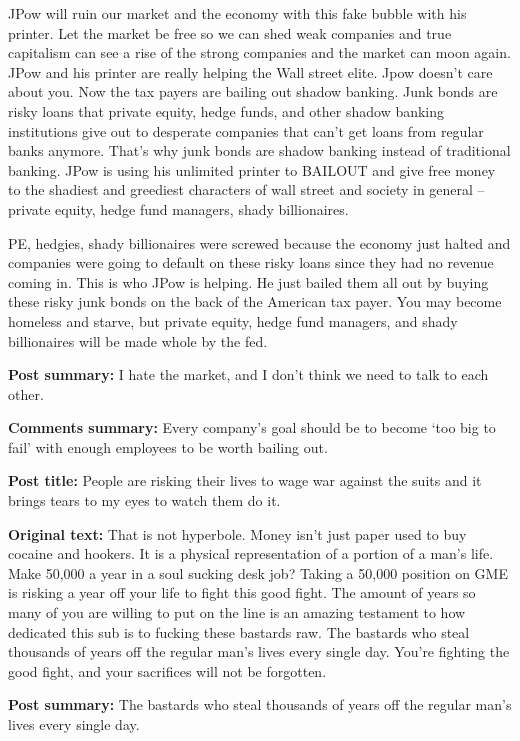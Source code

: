 JPow will ruin our market and the economy with this fake bubble with his printer. Let the market be free so we can shed weak companies and true capitalism can see a rise of the strong companies and the market can moon again. JPow and his printer are really helping the Wall street elite. Jpow doesn’t care about you. Now the tax payers are bailing out shadow banking. Junk bonds are risky loans that private equity, hedge funds, and other shadow banking institutions give out to desperate companies that can’t get loans from regular banks anymore. That’s why junk bonds are shadow banking instead of traditional banking. JPow is using his unlimited printer to BAILOUT and give free money to the shadiest and greediest characters of wall street and society in general -- private equity, hedge fund managers, shady billionaires.

PE, hedgies, shady billionaires were screwed because the economy just halted and companies were going to default on these risky loans since they had no revenue coming in. This is who JPow is helping. He just bailed them all out by buying these risky junk bonds on the back of the American tax payer. You may become homeless and starve, but private equity, hedge fund managers, and shady billionaires will be made whole by the fed.

\textbf{Post summary:} I hate the market, and I don’t think we need to talk to each other.

\textbf{Comments summary:} Every company’s goal should be to become ‘too big to fail’ with enough employees to be worth bailing out.

\textbf{Post title:} People are risking their lives to wage war against the suits and it brings tears to my eyes to watch them do it.

\textbf{Original text:} That is not hyperbole. Money isn’t just paper used to buy cocaine and hookers. It is a physical representation of a portion of a man’s life. Make 50,000 a year in a soul sucking desk job? Taking a 50,000 position on GME is risking a year off your life to fight this good fight. The amount of years so many of you are willing to put on the line is an amazing testament to how dedicated this sub is to fucking these bastards raw. The bastards who steal thousands of years off the regular man’s lives every single day. You’re fighting the good fight, and your sacrifices will not be forgotten.

\textbf{Post summary:} The bastards who steal thousands of years off the regular man’s lives every single day.

